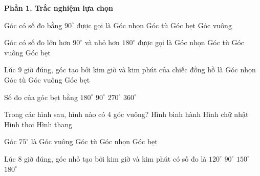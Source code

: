 \textbf{Phần 1. Trắc nghiệm lựa chọn}

\begin{ex} %
Góc có số đo bằng $90^\circ$ được gọi là
\choice
{Góc nhọn}
{Góc tù}
{Góc bẹt}
{\True Góc vuông}
\end{ex}

\begin{ex} %
Góc có số đo lớn hơn $90^\circ$ và nhỏ hơn $180^\circ$ được gọi là
\choice
{Góc nhọn}
{\True Góc tù}
{Góc vuông}
{Góc bẹt}
\end{ex}

\begin{ex} %
Lúc 9 giờ đúng, góc tạo bởi kim giờ và kim phút của chiếc đồng hồ là
\choice
{Góc nhọn}
{Góc tù}
{\True Góc vuông}
{Góc bẹt}
\end{ex}

\begin{ex} %
Số đo của góc bẹt bằng
\choice
{\True $180^\circ$}
{$90^\circ$}
{$270^\circ$}
{$360^\circ$}
\end{ex}

\begin{ex} %
Trong các hình sau, hình nào có 4 góc vuông?
\choice
{Hình bình hành}
{\True Hình chữ nhật}
{Hình thoi}
{Hình thang}
\end{ex}

\begin{ex} %
Góc $75^\circ$ là
\choice
{Góc vuông}
{Góc tù}
{\True Góc nhọn}
{Góc bẹt}
\end{ex}

\begin{ex} %
Lúc 8 giờ đúng, góc nhỏ tạo bởi kim giờ và kim phút có số đo là
\choice
{\True $120^\circ$}
{$90^\circ$}
{$150^\circ$}
{$180^\circ$}
\end{ex}


